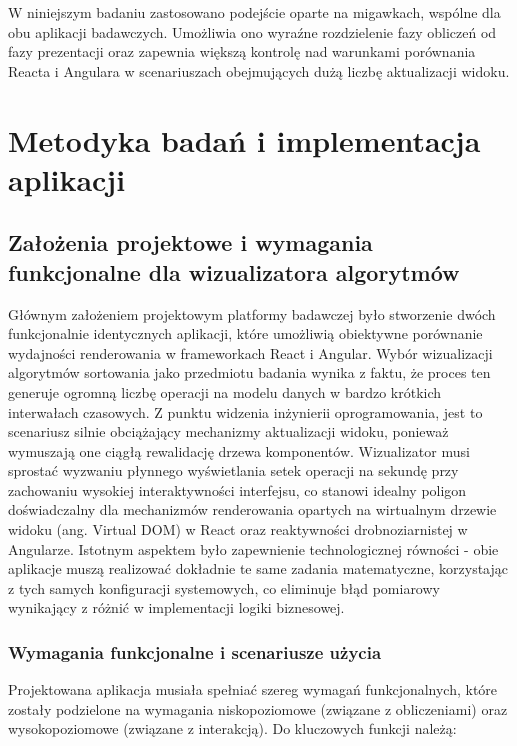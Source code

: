 \documentclass[12pt,openright,twoside]{report}
\begin{document}
W niniejszym badaniu zastosowano podejście oparte na migawkach, wspólne dla obu aplikacji badawczych. Umożliwia ono wyraźne rozdzielenie fazy obliczeń od fazy prezentacji oraz zapewnia większą kontrolę nad warunkami porównania Reacta i Angulara w scenariuszach obejmujących dużą liczbę aktualizacji widoku.


\chapter{Metodyka badań i implementacja aplikacji}

\section{Założenia projektowe i wymagania funkcjonalne dla wizualizatora algorytmów}
Głównym założeniem projektowym platformy badawczej było stworzenie dwóch funkcjonalnie identycznych aplikacji, które umożliwią obiektywne porównanie wydajności renderowania w frameworkach React i Angular. Wybór wizualizacji algorytmów sortowania jako przedmiotu badania wynika z faktu, że proces ten generuje ogromną liczbę operacji na modelu danych w bardzo krótkich interwałach czasowych. Z punktu widzenia inżynierii oprogramowania, jest to scenariusz silnie obciążający mechanizmy aktualizacji widoku, ponieważ wymuszają one ciągłą rewalidację drzewa komponentów. Wizualizator musi sprostać wyzwaniu płynnego wyświetlania setek operacji na sekundę przy zachowaniu wysokiej interaktywności interfejsu, co stanowi idealny poligon doświadczalny dla mechanizmów renderowania opartych na wirtualnym drzewie widoku (ang. Virtual DOM) w React oraz reaktywności drobnoziarnistej w Angularze. Istotnym aspektem było zapewnienie technologicznej równości - obie aplikacje muszą realizować dokładnie te same zadania matematyczne, korzystając z tych samych konfiguracji systemowych, co eliminuje błąd pomiarowy wynikający z różnić w implementacji logiki biznesowej.

\subsection{Wymagania funkcjonalne i scenariusze użycia}
Projektowana aplikacja musiała spełniać szereg wymagań funkcjonalnych, które zostały podzielone na wymagania niskopoziomowe (związane z obliczeniami) oraz wysokopoziomowe (związane z interakcją). Do kluczowych funkcji należą:
\end{document}

